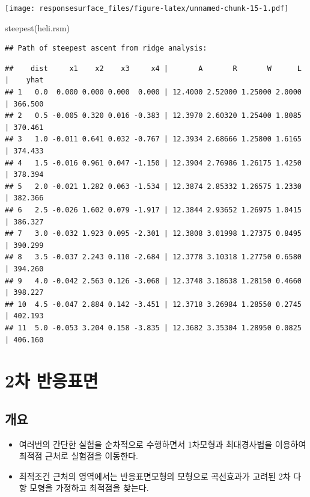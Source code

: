 \documentclass[
]{book}
\newenvironment{Shaded}{\begin{snugshade}}{\end{snugshade}}
\newcommand{\FunctionTok}[1]{\textcolor[rgb]{0.00,0.00,0.00}{#1}}
\newcommand{\NormalTok}[1]{#1}
\theoremstyle{definition}
\theoremstyle{definition}
\theoremstyle{definition}
\theoremstyle{definition}
\theoremstyle{remark}
\begin{document}
\texttt{[image: responsesurface\_files/figure-latex/unnamed-chunk-15-1.pdf]}

\begin{Shaded}
\begin{Highlighting}[]
\FunctionTok{steepest}\NormalTok{(heli.rsm)}
\end{Highlighting}
\end{Shaded}

\begin{verbatim}
## Path of steepest ascent from ridge analysis:
\end{verbatim}

\begin{verbatim}
##    dist     x1    x2    x3     x4 |       A       R       W      L |    yhat
## 1   0.0  0.000 0.000 0.000  0.000 | 12.4000 2.52000 1.25000 2.0000 | 366.500
## 2   0.5 -0.005 0.320 0.016 -0.383 | 12.3970 2.60320 1.25400 1.8085 | 370.461
## 3   1.0 -0.011 0.641 0.032 -0.767 | 12.3934 2.68666 1.25800 1.6165 | 374.433
## 4   1.5 -0.016 0.961 0.047 -1.150 | 12.3904 2.76986 1.26175 1.4250 | 378.394
## 5   2.0 -0.021 1.282 0.063 -1.534 | 12.3874 2.85332 1.26575 1.2330 | 382.366
## 6   2.5 -0.026 1.602 0.079 -1.917 | 12.3844 2.93652 1.26975 1.0415 | 386.327
## 7   3.0 -0.032 1.923 0.095 -2.301 | 12.3808 3.01998 1.27375 0.8495 | 390.299
## 8   3.5 -0.037 2.243 0.110 -2.684 | 12.3778 3.10318 1.27750 0.6580 | 394.260
## 9   4.0 -0.042 2.563 0.126 -3.068 | 12.3748 3.18638 1.28150 0.4660 | 398.227
## 10  4.5 -0.047 2.884 0.142 -3.451 | 12.3718 3.26984 1.28550 0.2745 | 402.193
## 11  5.0 -0.053 3.204 0.158 -3.835 | 12.3682 3.35304 1.28950 0.0825 | 406.160
\end{verbatim}

\hypertarget{secondorder}{%
\chapter{2차 반응표면}\label{secondorder}}

\hypertarget{uxac1cuxc694-1}{%
\section{개요}\label{uxac1cuxc694-1}}

\begin{itemize}
\item
  여러번의 간단한 실험을 순차적으로 수행하면서 1차모형과 최대경사법을 이용하여 최적점 근처로 실험점을 이동한다.
\item
  최적조건 근처의 영역에서는 반응표면모형의 모형으로 곡선효과가 고려된 2차 다항 모형을 가정하고 최적점을 찾는다.
\end{itemize}
\end{document}

